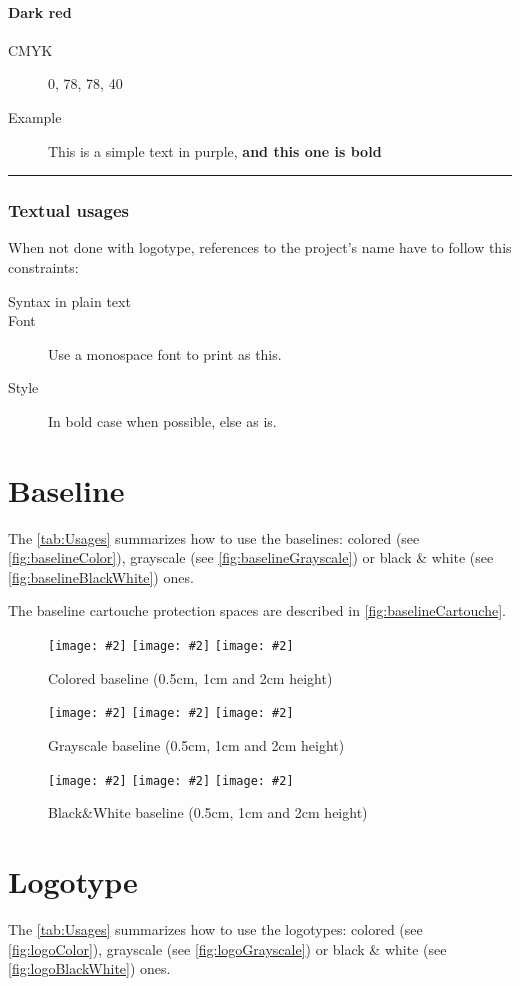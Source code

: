 \documentclass[a4paper,oneside,table]{article}
\newcommand{\proposition}[4][\textwidth]{%
    \begin{figure}[h]
        \centering
            \begin{minipage}[c]{#1}
                \centering
                \texttt{[image: \#2]}
                \vline{}
                \texttt{[image: \#2]}
                \vline{}
                \texttt{[image: \#2]}
                \caption{#3 (0.5cm, 1cm and 2cm height)}
                \label{#4}
            \end{minipage}
    \end{figure}
}
\begin{document}
\paragraph{Dark red}
\begin{description}
    \item[CMYK] 0, 78, 78, 40
    \item[Example] \textcolor{vilainRed}{This is a simple text in
  purple, \textbf{and this one is bold}}
\end{description}
\hrule

\subsubsection{Textual usages}
When not done with logotype, references to the project's name have to follow this constraints:
\begin{description}
    \item[Syntax in plain text] \texttt{\vilain{}}
    \item[Font] Use a monospace font to print \texttt{\vilain{}} as
    this.
    \item[Style] \texttt{\vilain{}} In bold case when possible, else
    as is.
\end{description}

\cleardoublepage{}
\section{Baseline}
The \tablename{} \vref{tab:Usages} summarizes how to use the
baselines: colored (see \figurename{} \vref{fig:baselineColor}),
grayscale (see \figurename{} \vref{fig:baselineGrayscale}) or black \&
white (see \figurename{} \vref{fig:baselineBlackWhite}) ones.

The baseline cartouche protection spaces are described in
\figurename{} \vref{fig:baselineCartouche}.

\proposition{baseline_color_cmyk.pdf}{Colored
  baseline}{fig:baselineColor}
\proposition{baseline_grayscale_cmyk.pdf}{Grayscale
  baseline}{fig:baselineGrayscale}
\proposition{baseline_black-and-white_cmyk.pdf}{Black\&White
  baseline}{fig:baselineBlackWhite}

\cleardoublepage{}
\section{Logotype}
The \tablename{} \vref{tab:Usages} summarizes how to use the
logotypes: colored (see \figurename{} \vref{fig:logoColor}),
grayscale (see \figurename{} \vref{fig:logoGrayscale}) or black \&
white (see \figurename{} \vref{fig:logoBlackWhite}) ones.
\end{document}
